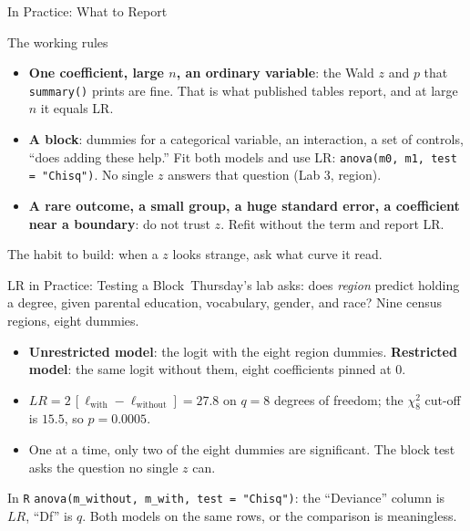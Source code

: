 \documentclass[aspectratio=169,11pt,xcolor=dvipsnames]{beamer}
\newcommand{\loglik}{\ell}
\newcommand{\core}{\,\raisebox{0.6pt}{\textcolor{corestar}{$\bigstar$}}}
\begin{document}
\begin{frame}{In Practice: What to Report\core}
\begin{block}{The working rules}
\begin{itemize}\itemsep5pt
  \item \textbf{One coefficient, large $n$, an ordinary variable}: the Wald
        $z$ and $p$ that \texttt{summary()} prints are fine. That is what
        published tables report, and at large $n$ it equals LR.
  \item \textbf{A block}: dummies for a categorical variable, an
        interaction, a set of controls, ``does adding these help.'' Fit both
        models and use LR: \texttt{anova(m0, m1, test = "Chisq")}. No
        single $z$ answers that question (Lab 3, region).
  \item \textbf{A rare outcome, a small group, a huge standard error, a
        coefficient near a boundary}: do not trust $z$. Refit without the
        term and report LR.
\end{itemize}
\end{block}
\vskip4pt
The habit to build: when a $z$ looks strange, ask what curve it read.
\end{frame}

\begin{frame}{LR in Practice: Testing a Block\core}
Thursday's lab asks: does \emph{region} predict holding a degree, given
parental education, vocabulary, gender, and race? Nine census regions,
eight dummies.
\begin{itemize}\itemsep3pt
  \item \textbf{Unrestricted model}: the logit with the eight region
        dummies. \textbf{Restricted model}: the same logit without them,
        eight coefficients pinned at $0$.
  \item $LR = 2\,[\loglik_{\text{with}} - \loglik_{\text{without}}] = 27.8$
        on $q = 8$ degrees of freedom; the $\chi^2_8$ cut-off is $15.5$,
        so $p = 0.0005$.
  \item One at a time, only two of the eight dummies are significant.
        The block test asks the question no single $z$ can.
\end{itemize}
\vskip4pt
\begin{block}{In \texttt{R}}
\texttt{anova(m\_without, m\_with, test = "Chisq")}: the ``Deviance''
column is $LR$, ``Df'' is $q$. Both models on the same rows, or the
comparison is meaningless.
\end{block}
\end{frame}
\end{document}
